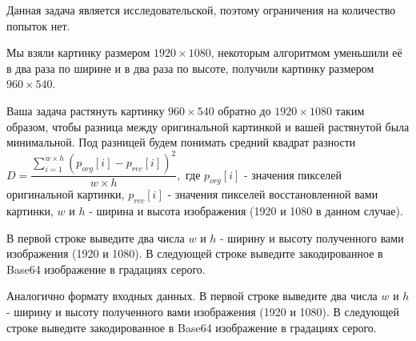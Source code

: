 
Данная задача является исследовательской, поэтому ограничения на количество попыток нет.

Мы взяли картинку размером $1920\times1080$, некоторым алгоритмом уменьшили её в два раза по ширине 
и в два раза по высоте, получили картинку размером $ 960\times540 $. 

Ваша задача растянуть картинку $ 960\times540 $ обратно до $ 1920\times1080 $ таким образом, 
чтобы разница между оригинальной картинкой и вашей растянутой была минимальной. Под разницей 
будем понимать средний квадрат разности $ D=\dfrac{\sum\limits_{i=1}^{w\times h} (p_{org}[i] - p_{rec}[i])^2}{w\times h},$ 
где $ p_{org}[i]$ - значения пикселей оригинальной картинки, $  p_{rec}[i] $ - значения пикселей восстановленной вами картинки, $ w $ и $ h $
- ширина и высота изображения (1920 и 1080 в данном случае).


В первой строке выведите два числа $ w $ и $ h $ - ширину и высоту полученного вами изображения 
(1920 и 1080). В следующей строке выведите закодированное в Base64 изображение в градациях серого.

\outputfmtSection

Аналогично формату входных данных. В первой строке выведите два числа $ w $ и $ h $ - ширину и высоту 
полученного вами изображения (1920 и 1080). В следующей строке выведите закодированное в 
Base64 изображение в градациях серого.

